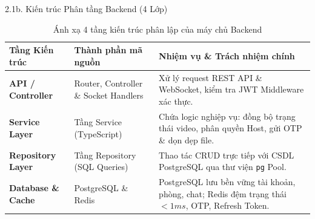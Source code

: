 \documentclass[aspectratio=169,11pt]{beamer}
\begin{document}
\begin{frame}{2.1b. Kiến trúc Phân tầng Backend (4 Lớp)}
    \begin{table}[h!]
    \centering
    \small
    \begin{tabular}{|p{2.8cm}|p{3.8cm}|p{5.8cm}|}
    \hline
    \textbf{Tầng Kiến trúc} & \textbf{Thành phần mã nguồn} & \textbf{Nhiệm vụ \& Trách nhiệm chính} \\ \hline
    \textbf{API / Controller} & Router, Controller \& Socket Handlers & Xử lý request REST API \& WebSocket, kiểm tra JWT Middleware xác thực. \\ \hline
    \textbf{Service Layer} & Tầng Service (TypeScript) & Chứa logic nghiệp vụ: đồng bộ trạng thái video, phân quyền Host, gửi OTP \& dọn dẹp file. \\ \hline
    \textbf{Repository Layer} & Tầng Repository (SQL Queries) & Thao tác CRUD trực tiếp với CSDL PostgreSQL qua thư viện \texttt{pg} Pool. \\ \hline
    \textbf{Database \& Cache} & PostgreSQL \& Redis & PostgreSQL lưu bền vững tài khoản, phòng, chat; Redis đệm trạng thái $<1ms$, OTP, Refresh Token. \\ \hline
    \end{tabular}
    \caption{Ánh xạ 4 tầng kiến trúc phân lập của máy chủ Backend}
    \end{table}
\end{frame}
\end{document}
